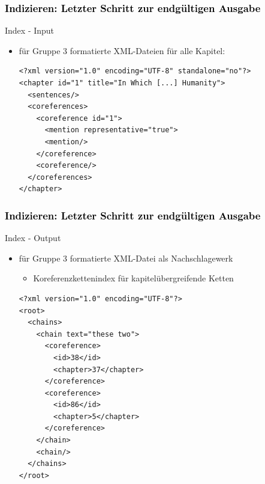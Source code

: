 \documentclass[xcolor=dvipsnames]{beamer}
\begin{document}

\begin{frame}[fragile]\frametitle{\textcolor{black}{Indizieren: Letzter Schritt zur endgültigen Ausgabe}}

\begin{block}{Index - Input}
\begin{itemize}
\item für Gruppe 3 formatierte XML-Dateien für alle Kapitel: 
\begin{small}\begin{verbatim}
<?xml version="1.0" encoding="UTF-8" standalone="no"?>
<chapter id="1" title="In Which [...] Humanity">
  <sentences/>
  <coreferences>
    <coreference id="1">
      <mention representative="true">
      <mention/>
    </coreference>
    <coreference/>
  </coreferences>
</chapter>
\end{verbatim}
\end{small}
\end{itemize}
\end{block}

\end{frame}

\begin{frame}[fragile]\frametitle{\textcolor{black}{Indizieren: Letzter Schritt zur endgültigen Ausgabe}}

\begin{block}{Index - Output}
\begin{itemize}
\item für Gruppe 3 formatierte XML-Datei als Nachschlagewerk
\begin{itemize}
\item Koreferenzkettenindex für kapitelübergreifende Ketten
\end{itemize}
\begin{small}\begin{verbatim}
<?xml version="1.0" encoding="UTF-8"?>
<root>
  <chains>
    <chain text="these two">
      <coreference>
        <id>38</id>
        <chapter>37</chapter>
      </coreference>
      <coreference>
        <id>86</id>
        <chapter>5</chapter>
      </coreference>
    </chain>
    <chain/>
  </chains>
</root>
\end{verbatim}
\end{small}
\end{itemize}
\end{block}

\end{frame}

\end{document}
